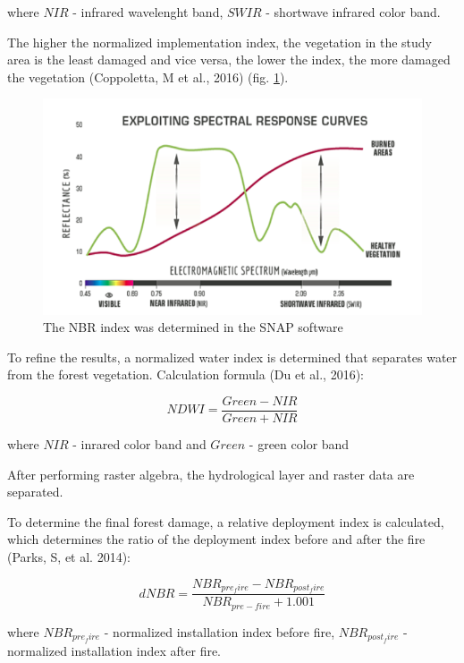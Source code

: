 	where $NIR$ - infrared wavelenght band, $SWIR$ - shortwave infrared color band.
	
	The higher the normalized implementation index, the vegetation in the study area is the least damaged and vice versa, the lower the index, the more damaged the vegetation (Coppoletta, M et al., 2016) (fig. \ref{fig:nbr_index}).
	
	\begin{figure}[H]
		\centering
		\includegraphics[width=0.9\linewidth]{images/nbr_index.png}
		\caption{The NBR index was determined in the SNAP software}
		\label{fig:nbr_index}
	\end{figure}

	To refine the results, a normalized water index is determined that separates water from the forest vegetation. Calculation formula (Du et al., 2016):
	
	\begin{equation}
	NDWI = \dfrac{Green - NIR}{Green + NIR}
	\end{equation}
	
	where $NIR$ - inrared color band and $Green$ - green color band
	
	After performing raster algebra, the hydrological layer and raster data are separated.
	
	To determine the final forest damage, a relative deployment index is calculated, which determines the ratio of the deployment index before and after the fire (Parks, S, et al. 2014):
	
	\begin{equation}
	\label{eq:dnbr}
	dNBR = \dfrac{NBR_{pre_fire} - NBR_{post_fire}}{NBR_{pre-fire} + 1.001}
	\end{equation}
	
	where $NBR_{pre_fire}$ - normalized installation index before fire, $NBR_{post_fire}$ - normalized installation index after fire.
	
